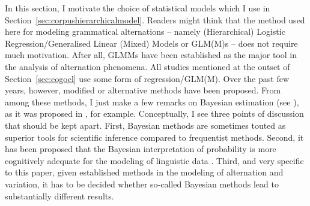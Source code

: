 \documentclass[USenglish]{article}
\begin{document}
In this section, I motivate the choice of statistical models which I use in Section~\ref{sec:corpushierarchicalmodel}.
Readers might think that the method used here for modeling grammatical alternations -- namely (Hierarchical) Logistic Regression\slash Generalised Linear (Mixed) Models or GLM(M)s -- does not require much motivation.
After all, GLMMs have been established as the major tool in the analysis of alternation phenomena.
All studies mentioned at the outset of Section~\ref{sec:cogocl} use some form of regression\slash GLM(M).
Over the past few years, however, modified or alternative methods have been proposed.
From among these methods, I just make a few remarks on Bayesian estimation (see \citealp{GelmanEa2014}), as it was proposed in \cite{Levshina2016,Divjak2016a}, for example.
Conceptually, I see three points of discussion that should be kept apart.
First, Bayesian methods are sometimes touted as superior tools for scientific inference compared to frequentist methods.
Second, it has been proposed that the Bayesian interpretation of probability is more cognitively adequate for the modeling of linguistic data \cite[301--302]{Divjak2016a}.
Third, and very specific to this paper, given established methods in the modeling of alternation and variation, it has to be decided whether so-called Bayesian methods lead to substantially different results.
\end{document}
